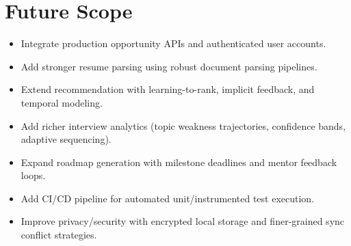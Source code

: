 \documentclass[conference]{IEEEtran}
\begin{document}
\section{Future Scope}

\begin{itemize}
  \item Integrate production opportunity APIs and authenticated user accounts.
  \item Add stronger resume parsing using robust document parsing pipelines.
  \item Extend recommendation with learning-to-rank, implicit feedback, and temporal modeling.
  \item Add richer interview analytics (topic weakness trajectories, confidence bands, adaptive sequencing).
  \item Expand roadmap generation with milestone deadlines and mentor feedback loops.
  \item Add CI/CD pipeline for automated unit/instrumented test execution.
  \item Improve privacy/security with encrypted local storage and finer-grained sync conflict strategies.
\end{itemize}
\end{document}
